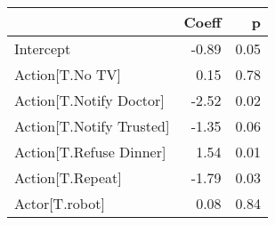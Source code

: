 \begin{tabular}{lrr}
\toprule
{} &  Coeff &    p \\
\midrule
Intercept                &  -0.89 & 0.05 \\
Action[T.No TV]          &   0.15 & 0.78 \\
Action[T.Notify Doctor]  &  -2.52 & 0.02 \\
Action[T.Notify Trusted] &  -1.35 & 0.06 \\
Action[T.Refuse Dinner]  &   1.54 & 0.01 \\
Action[T.Repeat]         &  -1.79 & 0.03 \\
Actor[T.robot]           &   0.08 & 0.84 \\
\bottomrule
\end{tabular}
